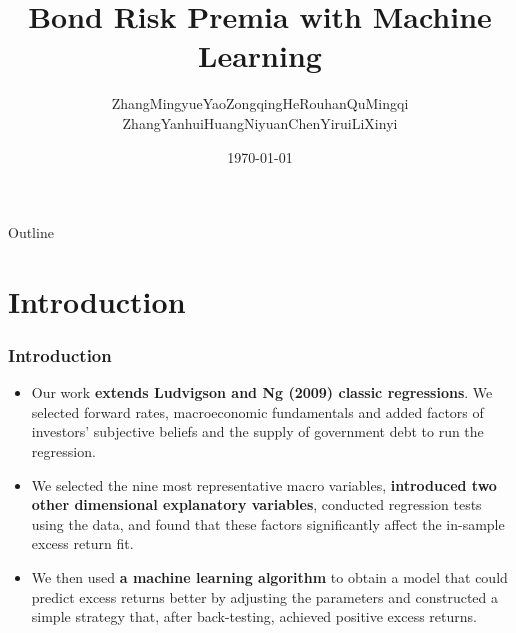 \documentclass{beamer}
\title{Bond Risk Premia with Machine Learning}
\author{ZhangMingyue\quad YaoZongqing\quad HeRouhan\quad QuMingqi\\
\quad ZhangYanhui\quad HuangNiyuan\quad ChenYirui\quad LiXinyi}
\institute{ZheJiang University}
\date{\today}
\begin{document}
\frame{\titlepage}

\begin{spacing}{1.2}
    \begin{frame}{Outline}
      \begin{multicols}{2}
      \large{\tableofcontents}
      \end{multicols}
    \end{frame}
\end{spacing}



\section{Introduction}
\frame
{
  \frametitle{Introduction}

  \begin{itemize}
    \item<1-> 
    Our work \textbf{extends Ludvigson and Ng (2009) classic regressions}. We selected forward rates, macroeconomic fundamentals and added factors of investors' subjective beliefs and the supply of government debt to run the regression. 
    \item<2-> 
    We selected the nine most representative macro variables, \textbf{introduced two other dimensional explanatory variables}, conducted regression tests using the data, and found that these factors significantly affect the in-sample excess return fit.
    \item<3->     
    We then used \textbf{a machine learning algorithm} to obtain a model that could predict excess returns better by adjusting the parameters and constructed a simple strategy that, after back-testing, achieved positive excess returns.
  \end{itemize}
}
\end{document}
